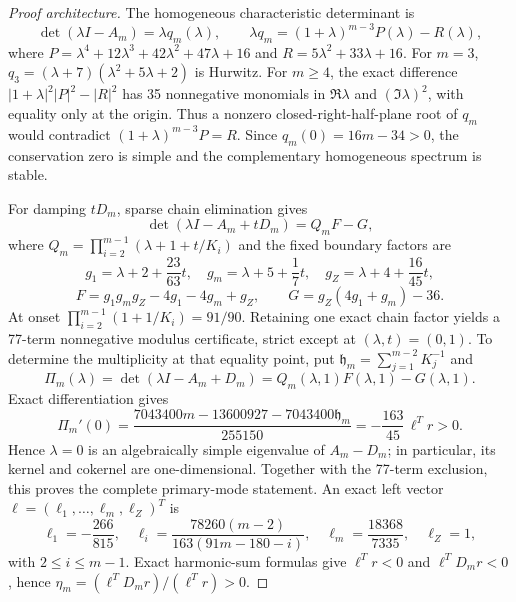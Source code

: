\documentclass[11pt]{article}
\theoremstyle{definition}
\newcommand{\1}{\mathbf 1}
\begin{document}
\begin{proof}[Proof architecture]
The homogeneous characteristic determinant is
\begin{equation}\label{eq:homprod}
 \det(\lambda I-A_m)=\lambda q_m(\lambda),\qquad
 \lambda q_m=(1+\lambda)^{m-3}P(\lambda)-R(\lambda),
\end{equation}
where
$P=\lambda^4+12\lambda^3+42\lambda^2+47\lambda+16$ and
$R=5\lambda^2+33\lambda+16$.  For $m=3$,
$q_3=(\lambda+7)(\lambda^2+5\lambda+2)$ is Hurwitz.  For $m\ge4$, the exact
difference $|1+\lambda|^2|P|^2-|R|^2$ has 35 nonnegative monomials in
$\Re\lambda$ and $(\Im\lambda)^2$, with equality only at the origin.  Thus a
nonzero closed-right-half-plane root of $q_m$ would contradict
$(1+\lambda)^{m-3}P=R$.  Since $q_m(0)=16m-34>0$, the conservation zero is
simple and the complementary homogeneous spectrum is stable.

For damping $tD_m$, sparse chain elimination gives
\begin{equation}\label{eq:qfgunit}
 \det(\lambda I-A_m+tD_m)=Q_mF-G,
\end{equation}
where
$Q_m=\prod_{i=2}^{m-1}(\lambda+1+t/K_i)$ and the fixed boundary factors are
\[
 g_1=\lambda+2+\frac{23}{63}t,\quad
 g_m=\lambda+5+\frac17t,\quad
 g_Z=\lambda+4+\frac{16}{45}t,
\]
\[
 F=g_1g_mg_Z-4g_1-4g_m+g_Z,
 \qquad G=g_Z(4g_1+g_m)-36.
\]
At onset $\prod_{i=2}^{m-1}(1+1/K_i)=91/90$.  Retaining one exact chain
factor yields a 77-term nonnegative modulus certificate, strict except at
$(\lambda,t)=(0,1)$.  To determine the multiplicity at that equality point,
put $\mathfrak h_m=\sum_{j=1}^{m-2}K_j^{-1}$ and
\[
 \Pi_m(\lambda)=\det(\lambda I-A_m+D_m)
 =Q_m(\lambda,1)F(\lambda,1)-G(\lambda,1).
\]
Exact differentiation gives
\begin{equation}\label{eq:selectedsimple}
 \Pi_m'(0)=
 \frac{7043400m-13600927-7043400\mathfrak h_m}{255150}
 =-\frac{163}{45}\,\ell^Tr>0.
\end{equation}
Hence $\lambda=0$ is an algebraically simple eigenvalue of $A_m-D_m$; in
particular, its kernel and cokernel are one-dimensional.  Together with the
77-term exclusion, this proves the complete primary-mode statement.
An exact left vector $\ell=(\ell_1,\ldots,\ell_m,\ell_Z)^T$ is
\begin{equation}\label{eq:ellimp}
 \ell_1=-\frac{266}{815},\quad
 \ell_i=\frac{78260(m-2)}{163(91m-180-i)},\quad
 \ell_m=\frac{18368}{7335},\quad \ell_Z=1,
\end{equation}
with $2\le i\le m-1$.  Exact harmonic-sum formulas give
$\ell^Tr<0$ and $\ell^TD_mr<0$, hence
$\eta_m=(\ell^TD_mr)/(\ell^Tr)>0$.


\end{proof}
\end{document}
